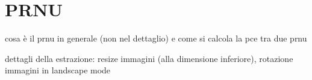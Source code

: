 \section{PRNU}



cosa è il prnu in generale (non nel dettaglio) e come si calcola la pce tra due prnu

dettagli della estrazione: resize immagini (alla dimensione inferiore), rotazione immagini in landscape mode